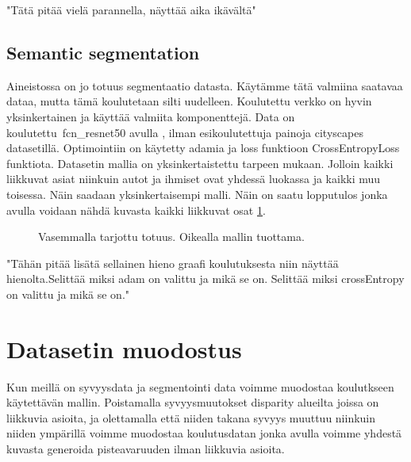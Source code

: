 "Tätä pitää vielä parannella, näyttää aika ikävältä"

\subsection{Semantic segmentation}

Aineistossa on jo totuus segmentaatio datasta. Käytämme tätä valmiina saatavaa dataa, mutta tämä koulutetaan silti uudelleen. Koulutettu verkko on hyvin yksinkertainen ja käyttää valmiita komponenttejä. Data on koulutettu\ fcn\_resnet50 avulla \cite{pytorchfcnresnet50}, ilman esikoulutettuja painoja cityscapes datasetillä. Optimointiin on käytetty adamia ja loss funktioon CrossEntropyLoss funktiota. Datasetin mallia on yksinkertaistettu tarpeen mukaan. Jolloin kaikki liikkuvat asiat niinkuin autot ja ihmiset ovat yhdessä luokassa ja kaikki muu toisessa. Näin saadaan yksinkertaisempi malli. Näin on saatu lopputulos jonka avulla voidaan nähdä kuvasta kaikki liikkuvat osat \ref{fig:segmentation1}.

\begin{figure}
\centering
{}
\caption[Tämä on lyhyt kuvateksti.]{Vasemmalla tarjottu totuus. Oikealla mallin tuottama.}
\label{fig:segmentation1}
\end{figure}
    

"Tähän pitää lisätä sellainen hieno graafi koulutuksesta niin näyttää hienolta.Selittää miksi adam on valittu ja mikä se on. Selittää miksi crossEntropy on valittu ja mikä se on."

\section{Datasetin muodostus}

Kun meillä on syvyysdata ja segmentointi data voimme muodostaa koulutkseen käytettävän mallin. Poistamalla syvyysmuutokset disparity alueilta joissa on liikkuvia asioita, ja olettamalla että niiden takana syvyys muuttuu niinkuin niiden ympärillä voimme muodostaa koulutusdatan jonka avulla voimme yhdestä kuvasta generoida pisteavaruuden ilman liikkuvia asioita.

